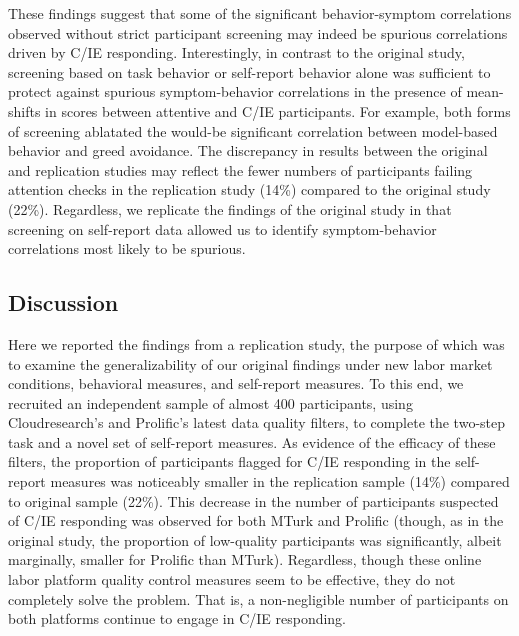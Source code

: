 \documentclass[a4paper,notitlepage,12pt]{article}
\begin{document}
\begin{refsection}[supp]
These findings suggest that some of the significant behavior-symptom correlations observed without strict participant screening may indeed be spurious correlations driven by C/IE responding. Interestingly, in contrast to the original study, screening based on task behavior or self-report behavior alone was sufficient to protect against spurious symptom-behavior correlations in the presence of mean-shifts in scores between attentive and C/IE participants. For example, both forms of screening ablatated the would-be significant correlation between model-based behavior and greed avoidance. The discrepancy in results between the original and replication studies may reflect the fewer numbers of participants failing attention checks in the replication study (14\%) compared to the original study (22\%). Regardless, we replicate the findings of the original study in that screening on self-report data allowed us to identify symptom-behavior correlations most likely to be spurious.

\subsection*{Discussion}

Here we reported the findings from a replication study, the purpose of which was to examine the generalizability of our original findings under new labor market conditions, behavioral measures, and self-report measures. To this end, we recruited an independent sample of almost 400 participants, using Cloudresearch's and Prolific's latest data quality filters, to complete the two-step task and a novel set of self-report measures. As evidence of the efficacy of these filters, the proportion of participants flagged for C/IE responding in the self-report measures was noticeably smaller in the replication sample (14\%) compared to original sample (22\%). This decrease in the number of participants suspected of C/IE responding was observed for both MTurk and Prolific (though, as in the original study, the proportion of low-quality participants was significantly, albeit marginally, smaller for Prolific than MTurk). Regardless, though these online labor platform quality control measures seem to be effective, they do not completely solve the problem. That is, a non-negligible number of participants on both platforms continue to engage in C/IE responding.


\end{refsection}
\end{document}
